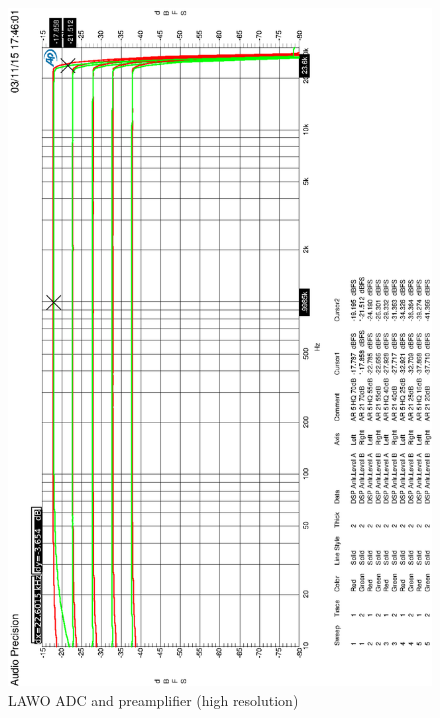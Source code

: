 \documentclass[11pt]{report}
\begin{document}
\begin{appendix}
\begin{figure}[htbp]
\begin{center}
\includegraphics[width=14cm,keepaspectratio=true]{HQLAWOVorverstaerker5u21dB}
\caption{LAWO ADC and preamplifier (high resolution)}
\label{Abb.:1}
\end{center}
\end{figure}


\end{appendix}
\end{document}
